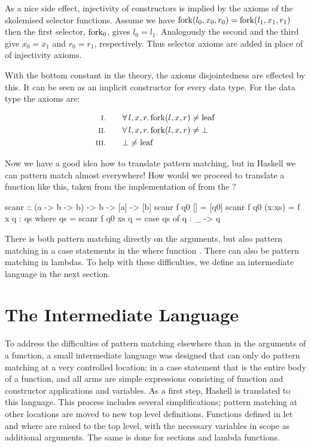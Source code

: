 \noindent
As a nice side effect, injectivity of constructors is implied by the
axioms of the skolemised selector functions. Assume we have
$\mathrm{fork}(l_0,x_0,r_0)=\mathrm{fork}(l_1,x_1,r_1)$ then the first
selector, $\mathrm{fork_0}$, gives $l_0=l_1$. Analogously the second and
the third give $x_0=x_1$ and $r_0=r_1$, respectively. Thus selector
axioms are added in place of of injectivity axioms.

With the bottom constant in the theory, the axioms disjointedness are
effected by this. It can be seen as an implicit constructor for every
data type. For the  data type the axioms are:

\begin{align*}
\rom{1} \qquad & \faaa{l}{x}{r} \fn{fork}(l,x,r) \neq \fn{leaf} \\
\rom{2} \qquad & \faaa{l}{x}{r} \fn{fork}(l,x,r) \neq \bot      \\
\rom{3} \qquad & \bot \neq \fn{leaf}
\end{align*}

Now we have a good idea how to translate pattern matching, but
in Haskell we can pattern match almost everywhere! How would we
proceed to translate a function like this, taken from the
implementation of  from the ?

\begin{code}
scanr             :: (a -> b -> b) -> b -> [a] -> [b]
scanr f q0 []     =  [q0]
scanr f q0 (x:xs) =  f x q : qs
                     where qs = scanr f q0 xs
                           q = case qs of
                                 q : _ -> q
\end{code}

\noindent
There is both pattern matching directly on the arguments, but also
pattern matching in a case statements in the where function
. There can also be pattern matching in lambdas. To help with
these difficulties, we define an intermediate language in the next
section.

\section{The Intermediate Language}

To address the difficulties of pattern matching elsewhere than in the
arguments of a function, a small intermediate language was designed
that can only do pattern matching at a very controlled location: in a
case statement that is the entire body of a function, and all arms are
simple expressions consisting of function and constructor applications
and variables. As a first step, Haskell is translated to this
language. This process includes several simplifications; pattern
matching at other locations are moved to new top level
definitions. Functions defined in let and where are raised to the
top level, with the necessary variables in scope as additional
arguments. The same is done for sections and lambda functions.


